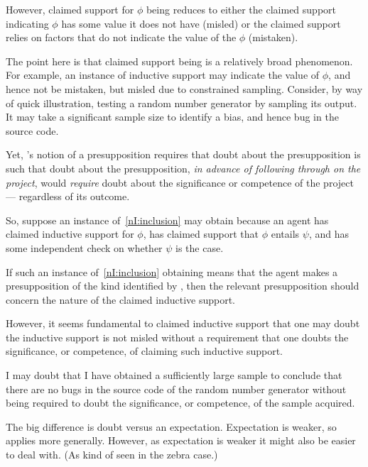 \begin{note}
  However, claimed support for \(\phi\) being \mom{} reduces to either the claimed support indicating \(\phi\) has some value it does not have (misled) or the claimed support relies on factors that do not indicate the value of the \(\phi\) (mistaken).

  The point here is that claimed support being \mom{} is a relatively broad phenomenon.
  For example, an instance of inductive support may indicate the value of \(\phi\), and hence not be mistaken, but misled due to constrained sampling.
  Consider, by way of quick illustration, testing a random number generator by sampling its output.
  It may take a significant sample size to identify a bias, and hence bug in the source code.

  Yet, \citeauthor{Wright:2011wn}'s notion of a presupposition requires that doubt about the presupposition is such that doubt about the presupposition, \emph{in advance of following through on the project}, would \emph{require} doubt about the significance or competence of the project --- regardless of its outcome.

  So, suppose an instance of~\ref{nI:inclusion} may obtain because an agent has claimed inductive support for \(\phi\), has claimed support that \(\phi\) entails \(\psi\), and has some independent check on whether \(\psi\) is the case.

  If such an instance of~\ref{nI:inclusion} obtaining means that the agent makes a presupposition of the kind identified by \wrt{}, then the relevant presupposition should concern the nature of the claimed inductive support.

  However, it seems fundamental to claimed inductive support that one may doubt the inductive support is not misled without a requirement that one doubts the significance, or competence, of claiming such inductive support.

  I may doubt that I have obtained a sufficiently large sample to conclude that there are no bugs in the source code of the random number generator without being required to doubt the significance, or competence, of the sample acquired.
\end{note}

\begin{note}
  \color{red}
  The big difference is doubt versus an expectation.
  Expectation is weaker, so applies more generally.
  However, as expectation is weaker it might also be easier to deal with.
  (As kind of seen in the zebra case.)
\end{note}

